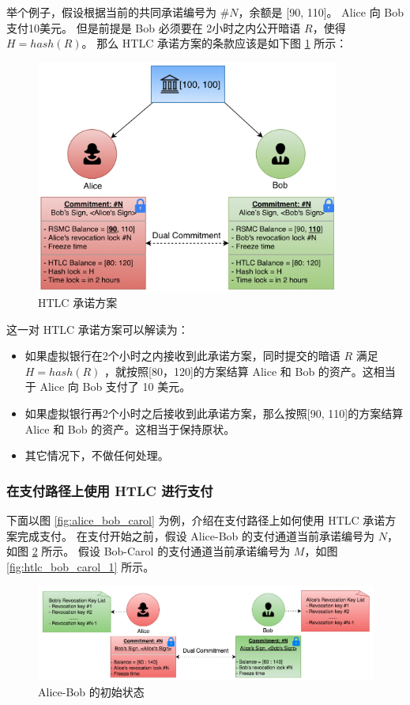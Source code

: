 举个例子，假设根据当前的共同承诺编号为 $\#N$，余额是 [90, 110]。
Alice 向 Bob 支付10美元。
但是前提是 Bob 必须要在 2小时之内公开暗语 $R$，使得 $H = hash(R)$。
那么 HTLC 承诺方案的条款应该是如下图 \ref{fig:htlc_sample} 所示：

\begin{figure}[h!]
    \centering
    \includegraphics[width=10cm, keepaspectratio]{../images/htlc_sample.png}
    \caption{HTLC 承诺方案}
    \label{fig:htlc_sample}
\end{figure}

这一对 HTLC 承诺方案可以解读为：

\begin{itemize}
    \item 如果虚拟银行在2个小时之内接收到此承诺方案，同时提交的暗语 $R$ 满足 $H = hash(R)$ ，就按照[80，120]的方案结算 Alice 和 Bob 的资产。这相当于 Alice 向 Bob 支付了 10 美元。
    \item 如果虚拟银行再2个小时之后接收到此承诺方案，那么按照[90, 110]的方案结算 Alice 和 Bob 的资产。这相当于保持原状。
    \item 其它情况下，不做任何处理。
\end{itemize}


\subsubsection{在支付路径上使用 HTLC 进行支付} \label{sec:htlc_pay}
下面以图 \ref{fig:alice_bob_carol} 为例，介绍在支付路径上如何使用 HTLC 承诺方案完成支付。
在支付开始之前，假设 Alice-Bob 的支付通道当前承诺编号为 $N$，如图 \ref{fig:htlc_alice_bob_1} 所示。
假设 Bob-Carol 的支付通道当前承诺编号为 $M$，如图 \ref{fig:htlc_bob_carol_1} 所示。

\begin{figure}[h!]
    \centering
    \includegraphics[width=12cm, keepaspectratio]{../images/alice_bob_1.png}
    \caption{Alice-Bob 的初始状态}
    \label{fig:htlc_alice_bob_1}
\end{figure}


